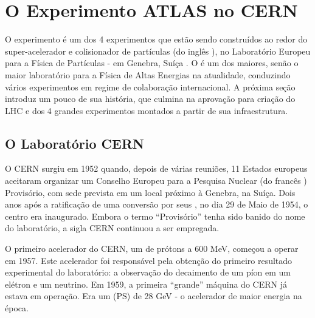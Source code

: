 \typeout{ ====================================================================}
\typeout{ ====================================================================}

\chapter{O Experimento ATLAS no CERN}
\label{chap:atlas}


O experimento  é um dos 4 experimentos que estão sendo construídos
ao redor do super-acelerador e colisionador de partículas  (do inglês
), no Laboratório Europeu para a Física de
Partículas -  em Genebra, Suíça \cite{atlas-tp}. O  é um
dos maiores, senão o maior laboratório para a Física de Altas Energias na
atualidade, conduzindo vários experimentos em regime de colaboração
internacional. A próxima seção introduz um pouco de sua história, que culmina
na aprovação para criação do LHC e dos 4 grandes experimentos montados a
partir de sua infraestrutura.

\section{O Laboratório CERN}

O CERN surgiu em 1952 quando, depois de várias reuniões, 11 Estados europeus
aceitaram organizar um Conselho Europeu para a Pesquisa Nuclear (do francês
) Provisório, com sede
prevista em um local próximo à Genebra, na Suíça. Dois anos após a ratificação
de uma conversão por seus , no dia 29 de Maio de 1954, o
centro era inaugurado. Embora o termo ``Provisório'' tenha sido banido do nome
do laboratório, a sigla CERN continuou a ser empregada.
 
O primeiro acelerador do CERN, um
 de prótons a 600 MeV, começou a operar em
1957. Este acelerador foi responsável pela obtenção do primeiro resultado
experimental do laboratório: a observação do decaimento de um píon em um
elétron e um neutrino. Em 1959, a primeira ``grande'' máquina do CERN já
estava em operação. Era um  (PS) de 28 GeV - o
acelerador de maior energia na época.

